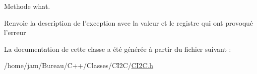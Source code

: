 Methode what. 

\begin{DoxyReturn}{Renvoie}
la description de l'exception avec la valeur et le registre qui ont provoqué l'erreur 
\end{DoxyReturn}


La documentation de cette classe a été générée à partir du fichier suivant \+:\begin{DoxyCompactItemize}
\item 
/home/jam/\+Bureau/\+C++/\+Classes/\+C\+I2\+C/\hyperlink{CI2C_8h}{C\+I2\+C.\+h}\end{DoxyCompactItemize}
